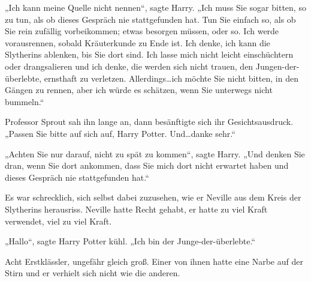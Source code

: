 „Ich kann meine Quelle nicht nennen“, sagte Harry. „Ich muss Sie sogar bitten, so zu tun, als ob dieses Gespräch nie stattgefunden hat. Tun Sie einfach so, als ob Sie rein zufällig vorbeikommen; etwas besorgen müssen, oder so. Ich werde vorausrennen, sobald Kräuterkunde zu Ende ist. Ich denke, ich kann die Slytherins ablenken, bis Sie dort sind. Ich lasse mich nicht leicht einschüchtern oder drangsalieren und ich denke, die werden sich nicht trauen, den Jungen-der-überlebte, ernsthaft zu verletzen. Allerdings…ich möchte Sie nicht bitten, in den Gängen zu rennen, aber ich würde es schätzen, wenn Sie unterwegs nicht bummeln.“

Professor Sprout sah ihn lange an, dann besänftigte sich ihr Gesichtsausdruck. „Passen Sie bitte auf sich auf, Harry Potter. Und…danke sehr.“

„Achten Sie nur darauf, nicht zu spät zu kommen“, sagte Harry. „Und denken Sie dran, wenn Sie dort ankommen, dass Sie mich dort nicht erwartet haben und dieses Gespräch nie stattgefunden hat.“

\later

Es war schrecklich, sich selbst dabei zuzusehen, wie er Neville aus dem Kreis der Slytherins herausriss. Neville hatte Recht gehabt, er hatte zu viel Kraft verwendet, viel zu viel Kraft.

„Hallo“, sagte Harry Potter kühl. „Ich bin der Junge-der-überlebte.“

Acht Erstklässler, ungefähr gleich groß. Einer von ihnen hatte eine Narbe auf der Stirn und er verhielt sich nicht wie die anderen.

